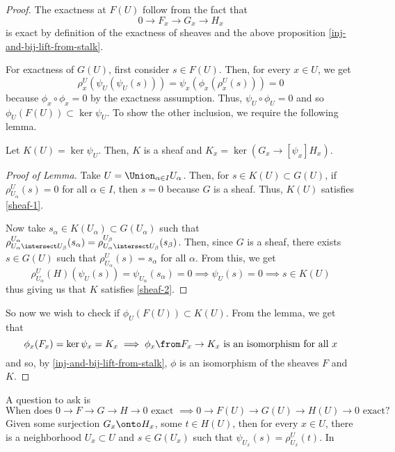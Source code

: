 \documentclass[11pt,leqno,oneside]{amsbook}
\renewcommand{\F}{F} %
\newcommand{\G}{G}
\renewcommand{\H}{H}
\newcommand{\K}{K}
\numberwithin{thm}{section}
\begin{document}
\begin{proof}
  The exactness at \(\F(U)\) follow from the fact that \[
    0 \to \F_x \to \G_x \to \H_x
  \]
  is exact by definition of the exactness of sheaves and the above
  proposition 
  \ref{inj-and-bij-lift-from-stalk}.

  For exactness of \(\G(U)\), first consider \(s \in \F(U)\). Then,
  for every \(x \in U\), we get \[
    \rho^U_x(\psi_U(\psi_U(s))) = \psi_x(\phi_x(\rho^U_x(s))) = 0
  \]
  because \(\phi_x \circ \phi_x = 0\) by the exactness
  assumption. Thus, \(\psi_U \circ \phi_U = 0\) and so \(\phi_U(\F(U))
  \subset \ker \psi_U\). To show the other inclusion, we require the
  following lemma. 
  \begin{lem}
    Let \(\K(U) = \ker \psi_U\). Then, \(\K\) is a sheaf and \(\K_x =
    \ker(\G_x \to[\psi_x] \H_x)\).
  \end{lem}
  \begin{proof}[Proof of Lemma]
    Take \(U = \Union_{\alpha \in I} U_\alpha\). Then, for \(s \in
    \K(U) \subset \G(U)\), if
    \(\rho^U_{U_\alpha}(s) = 0\) for all \(\alpha \in I\), then \(s 
    = 0\) because \(\G\) is a sheaf. Thus, \(\K(U)\) satisfies
    \ref{sheaf-1}.

    Now take \(s_\alpha \in \K(U_\alpha) \subset \G(U_\alpha)\) such
    that \(\rho^{U_\alpha}_{U_\alpha \intersect U_\beta}(s_\alpha) =
    \rho^{U_\beta}_{U_\alpha \intersect U_\beta}(s_\beta)\). Then,
    since \(\G\) is a sheaf, there exists \(s \in \G(U)\) such that
    \(\rho^U_{U_\alpha}(s) = s_\alpha\) for all \(\alpha\). From this,
    we get \[
      \rho^U_{U_\alpha}(\H)(\psi_U(s)) = \psi_{U_\alpha}(s_\alpha) = 0
      \implies \psi_U(s) = 0 \implies s \in \K(U)
    \]
    thus giving us that \(\K\) satisfies \ref{sheaf-2}.
  \end{proof}
  So now we wish to check if \(\phi_U(\F(U)) \subset \K(U)\). From the
  lemma, we get that \[
    \phi_x(\F_x) = \ker \psi_x = K_x \implies \phi_x \from \F_x \to
    \K_x \text{ is an isomorphism for all }x
  \]
  and so, by \ref{inj-and-bij-lift-from-stalk}, \(\phi\) is an
  isomorphism of the sheaves \(\F\) 
  and \(\K\). 
\end{proof}
A question to ask is \[
  \text{When does }0 \to \F \to \G \to \H \to 0 \text{ exact }\implies
  0 \to \F(U) \to \G(U) \to \H(U) \to 0 \text{ exact?}
\]
Given some surjection \(\G_x \onto \H_x\), some \(t \in \H(U)\), then
for every \(x \in U\), there is a neighborhood \(U_x \subset U\) and
\(s \in \G(U_x)\) such that \(\psi_{U_x}(s) = \rho^U_{U_x}(t)\). In
\end{document}
